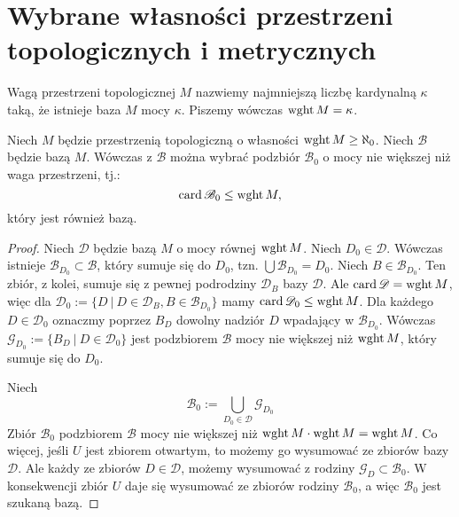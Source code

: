 \section{Wybrane własności przestrzeni topologicznych i metrycznych}
 
\begin{df}
  Wagą przestrzeni topologicznej $M$ nazwiemy najmniejszą liczbę kardynalną $\kappa$ taką, że istnieje baza $M$ mocy $\kappa$. Piszemy wówczas $\operatorname{wght} M = \kappa$.
\end{df}
 
\begin{lem} \label{lem:base-small}
  Niech $M$ będzie przestrzenią topologiczną o własności $\operatorname{wght} M \geq \aleph_0$. Niech $\mathcal B$ będzie bazą $M$. Wówczas z $\mathcal B$ można wybrać podzbiór $\mathcal B_0$ o mocy nie większej niż waga przestrzeni, tj.:
  \[
    \operatorname{card} \mathscr B_0 \leq \operatorname{wght} M,
  \]
  który jest również bazą.
  \begin{proof}
    Niech $\mathcal D$ będzie bazą $M$ o mocy równej $\operatorname{wght} M$. Niech $D_0 \in \mathcal D$. Wówczas istnieje $\mathcal B_{D_0} \subset \mathcal B$, który sumuje się do $D_0$, tzn. $\bigcup \mathcal B_{D_0} = D_0$. Niech $B \in \mathcal B_{D_0}$. Ten zbiór, z kolei, sumuje się z pewnej podrodziny $\mathcal D_B$ bazy $\mathcal D$. Ale $\operatorname{card}\mathscr D = \operatorname{wght} M$, więc dla $\mathcal D_0 := \{D\ |\ D \in \mathcal D_B, B \in \mathcal B_{D_0}\}$ mamy $\operatorname{card}\mathscr D_0 \leq \operatorname{wght} M$. Dla każdego $D \in \mathcal D_0$ oznaczmy poprzez $B_D$ dowolny nadziór $D$ wpadający w $\mathcal B_{D_0}$. Wówczas $\mathcal G_{D_0} := \{B_D\ |\ D \in \mathcal D_0\}$ jest podzbiorem $\mathcal B$ mocy nie większej niż $\operatorname{wght} M$, który sumuje się do $D_0$.
    
    Niech
    \[
      \mathcal B_0 := \bigcup_{D_0 \in \mathcal D} \mathcal G_{D_0}
    \]
    Zbiór $\mathcal B_0$ podzbiorem $\mathcal B$ mocy nie większej niż $\operatorname{wght} M \cdot \operatorname{wght} M = \operatorname{wght} M$. Co więcej, jeśli $U$ jest zbiorem otwartym, to możemy go wysumować ze zbiorów bazy $\mathcal D$. Ale każdy ze zbiorów $D \in \mathcal{D}$, możemy wysumować z rodziny $\mathcal G_D \subset \mathcal B_0$. W konsekwencji zbiór $U$ daje się wysumować ze zbiorów rodziny $\mathcal B_0$, a więc $\mathcal B_0$ jest szukaną bazą.
  \end{proof}
\end{lem}
 
